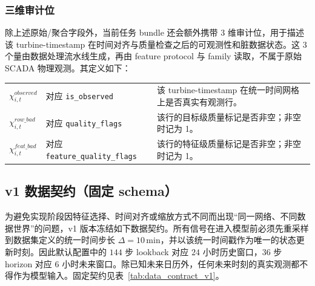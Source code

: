 \documentclass[11pt]{article}
\begin{document}
\begin{CJK}{UTF8}{gbsn}
\subsubsection{三维审计位}

除上述原始/聚合字段外，当前任务 bundle 还会额外携带 3 维审计位，用于描述该 turbine-timestamp
在时间对齐与质量检查之后的可观测性和脏数据状态。这 3 个量由数据处理流水线生成，再由
feature protocol 与 family 读取，不属于原始 SCADA 物理观测。其定义如下：

\noindent
\renewcommand{\arraystretch}{1.15}
\begin{tabularx}{\linewidth}{@{}L{3.2cm}L{4.5cm}X@{}}
$\chi^{observed}_{i,t}$ & 对应 \texttt{is\_observed} & 该 turbine-timestamp 在统一时间网格上是否真实有观测行。 \\
$\chi^{row\_bad}_{i,t}$ & 对应 \texttt{quality\_flags} & 该行的目标级质量标记是否非空；非空时记为 1。 \\
$\chi^{feat\_bad}_{i,t}$ & 对应 \texttt{feature\_quality\_flags} & 该行的特征级质量标记是否非空；非空时记为 1。 \\
\end{tabularx}

\subsection{v1 数据契约（固定 schema）}

为避免实现阶段因特征选择、时间对齐或缩放方式不同而出现“同一网络、不同数据世界”的问题，v1 版本冻结如下数据契约。所有信号在进入模型前必须先重采样到数据集定义的统一时间步长 $\Delta=10\,\mathrm{min}$，并以该统一时间戳作为唯一的状态更新时刻。因此默认配置中的 $144$ 步 lookback 对应 $24$ 小时历史窗口，$36$ 步 horizon 对应 $6$ 小时未来窗口。除已知未来日历外，任何未来时刻的真实观测都不得作为模型输入。固定契约见表~\ref{tab:data_contract_v1}。


\end{CJK}
\end{document}
